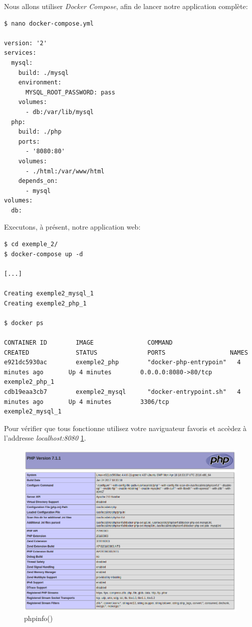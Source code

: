 Nous allons utiliser \emph{Docker Compose}, afin de lancer notre application complète:

\begin{lstlisting}[frame=single]
$ nano docker-compose.yml

version: '2'
services:
  mysql:
    build: ./mysql
    environment:
      MYSQL_ROOT_PASSWORD: pass
    volumes:
      - db:/var/lib/mysql
  php:
    build: ./php
    ports:
      - '8080:80'
    volumes:
      - ./html:/var/www/html
    depends_on:
      - mysql
volumes:
  db:

\end{lstlisting}

Executons, à présent, notre application web:

\begin{lstlisting}[frame=single]
$ cd exemple_2/
$ docker-compose up -d

[...]

Creating exemple2_mysql_1
Creating exemple2_php_1

$ docker ps

CONTAINER ID        IMAGE               COMMAND                  CREATED             STATUS              PORTS                  NAMES
e921dc5930ac        exemple2_php        "docker-php-entrypoin"   4 minutes ago       Up 4 minutes        0.0.0.0:8080->80/tcp   exemple2_php_1
cdb19eaa3cb7        exemple2_mysql      "docker-entrypoint.sh"   4 minutes ago       Up 4 minutes        3306/tcp               exemple2_mysql_1

\end{lstlisting}

Pour vérifier que tous fonctionne utilisez votre naviguateur favoris et accèdez à l'addresse \emph{localhost:8080} \ref{fig:phpinfo}.

\begin{figure}[H] 
\centering 
\includegraphics[width=1\columnwidth]{img/phpinfo} 
\caption[phpinfo]{phpinfo()}
\label{fig:phpinfo} 
\end{figure}

